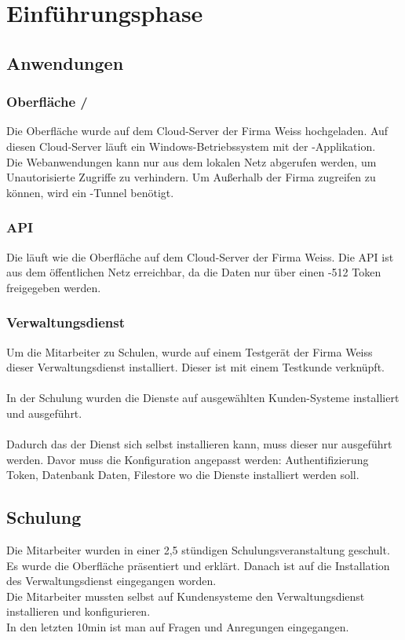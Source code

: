 \section{Einführungsphase}
\label{sec:Einfuehrungsphase}

\subsection{Anwendungen}
\label{sec:programs_install}

\subsubsection{Oberfläche / }
\label{sec:UI}

Die Oberfläche wurde auf dem Cloud-Server der Firma Weiss hochgeladen. Auf diesen Cloud-Server läuft ein Windows-Betriebssystem mit der -Applikation. \\
Die Webanwendungen kann nur aus dem lokalen Netz abgerufen werden, um Unautorisierte Zugriffe zu verhindern. Um Außerhalb der Firma zugreifen zu können, wird ein -Tunnel benötigt. 

\subsubsection{API}
\label{sec:API}

Die  läuft wie die Oberfläche auf dem Cloud-Server der Firma Weiss. Die API ist aus dem öffentlichen Netz erreichbar, da die Daten nur über einen -512 Token freigegeben werden. 

\subsubsection{Verwaltungsdienst}
\label{sec:Service}

Um die Mitarbeiter zu Schulen, wurde auf einem Testgerät der Firma Weiss dieser Verwaltungsdienst installiert. Dieser ist mit einem Testkunde verknüpft.\\
\\
In der Schulung wurden die Dienste auf ausgewählten Kunden-Systeme installiert und ausgeführt.\\
\\
Dadurch das der Dienst sich selbst installieren kann, muss dieser nur ausgeführt werden. Davor muss die Konfiguration angepasst werden: Authentifizierung Token, Datenbank  Daten, Filestore wo die Dienste installiert werden soll. 

\subsection{Schulung}
\label{sec:Schulung}

Die Mitarbeiter wurden in einer 2,5 stündigen Schulungsveranstaltung geschult. Es wurde die Oberfläche präsentiert und erklärt. Danach ist auf die Installation des Verwaltungsdienst eingegangen worden. \\
Die Mitarbeiter mussten selbst auf Kundensysteme den Verwaltungsdienst installieren und konfigurieren. \\
In den letzten 10min ist man auf Fragen und Anregungen eingegangen.
